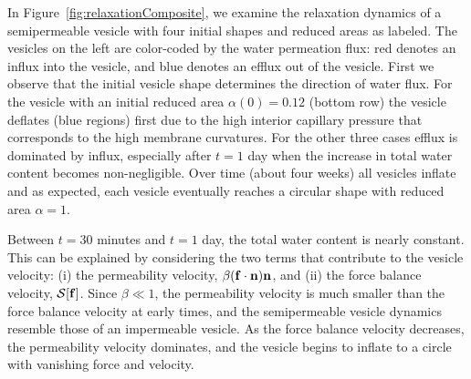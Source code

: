 \documentclass[prb,preprint,showpacs,preprintnumbers,amsmath,amssymb,longbibliography]{revtex4-1}
\begin{document}
In Figure~\ref{fig:relaxationComposite}, we examine the relaxation
dynamics of a semipermeable vesicle with four initial shapes and reduced
areas as labeled. The vesicles on the left are color-coded by the water
permeation flux: red denotes an influx into the vesicle, and blue
denotes an efflux out of the vesicle. First we observe that the initial
vesicle shape determines the direction of water flux. For the vesicle
with an initial reduced area $\alpha(0)=0.12$ (bottom row) the vesicle
deflates (blue regions) first due to the high interior capillary
pressure that corresponds to the high membrane curvatures. For the other
three cases efflux is dominated by influx, especially after $t=1$ day
when the increase in total water content becomes non-negligible.
%
%
Over time (about four weeks) all vesicles inflate and as expected, each
vesicle eventually reaches a circular shape with reduced area
$\alpha=1$. 
%
%

Between $t=30$ minutes and $t=1$ day, the total water content is nearly constant.
%
%
This can be explained by considering the two terms that contribute to
the vesicle velocity: (i) the permeability velocity, $\beta(\mathbf{f} \cdot
\mathbf{n}) \mathbf{n}$, and (ii) the force balance velocity, $\mathcal{S}[\mathbf{f}]$. Since
$\beta\ll 1$, the permeability velocity is much smaller than the force
balance velocity at early times, and the semipermeable vesicle dynamics
resemble those of an impermeable vesicle. As the force balance velocity
decreases, the permeability velocity dominates, and the vesicle begins
to inflate to a circle with vanishing force and velocity. 
\end{document}
